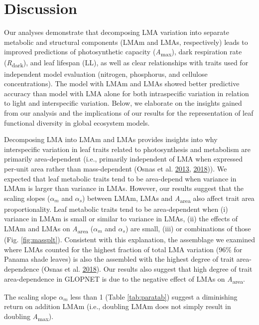 \documentclass[
  12pt,
]{article}
\begin{document}
\hypertarget{discussion}{%
\section{Discussion}\label{discussion}}

Our analyses demonstrate that decomposing LMA variation into separate metabolic and structural components (LMAm and LMAs, respectively) leads to improved predictions of photosynthetic capacity (\emph{A}\textsubscript{max}), dark respiration rate (\emph{R}\textsubscript{dark}), and leaf lifespan (LL), as well as clear relationships with traits used for independent model evaluation (nitrogen, phosphorus, and cellulose concentrations).
The model with LMAm and LMAs showed better predictive accuracy than model with LMA alone for both intraspecific variation in relation to light and interspecific variation.
Below, we elaborate on the insights gained from our analysis and the implications of our results for the representation of leaf functional diversity in global ecosystem models.

Decomposing LMA into LMAm and LMAs provides insights into why interspecific variation in leaf traits related to photosynthesis and metabolism are primarily area-dependent (i.e., primarily independent of LMA when expressed per-unit area rather than mass-dependent (Osnas et al. \protect\hyperlink{ref-Osnas2013}{2013}, \protect\hyperlink{ref-Osnas2018}{2018})).
We expected that leaf metabolic traits tend to be area-depend when variance in LMAm is larger than variance in LMAs.
However, our results suggest that the scaling slopes (\(\alpha_m\) and \(\alpha_s\)) between LMAm, LMAs and \emph{A}\textsubscript{area} also affect trait area proportionality.
Leaf metabolic traits tend to be area-dependent when (i) variance in LMAm is small or similar to variance in LMAs, (ii) the effects of LMAm and LMAs on \emph{A}\textsubscript{area} (\(\alpha_m\) and \(\alpha_s\)) are small, (iii) or combinations of those (Fig. \ref{fig:massplt}).
Consistent with this explanation, the assemblage we examined where LMAs counted for the highest fraction of total LMA variation (96\% for Panama shade leaves) is also the assembled with the highest degree of trait area-dependence (Osnas et al. \protect\hyperlink{ref-Osnas2018}{2018}).
Our results also suggest that high degree of trait area-dependence in GLOPNET is due to the negative effect of LMAs on \emph{A}\textsubscript{area}.

The scaling slope \(\alpha_m\) less than 1 (Table \ref{tab:paratab}) suggest a diminishing return on addition LMAm (i.e., doubling LMAm does not simply result in doubling \emph{A}\textsubscript{max}).
\end{document}
